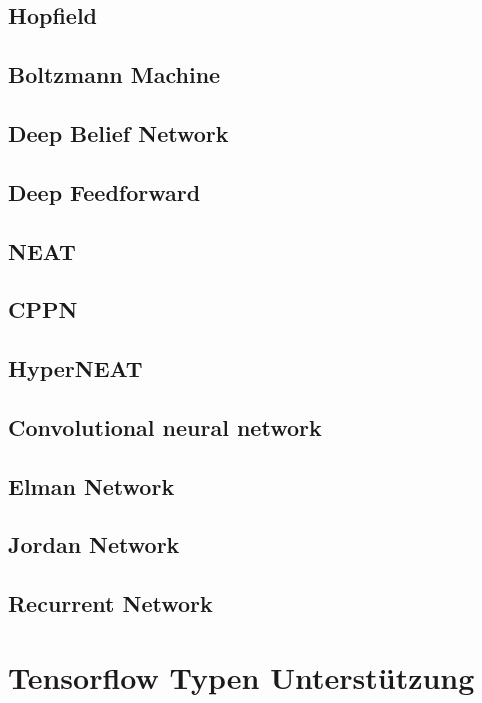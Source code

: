 \subsection{Hopfield}

\subsection{Boltzmann Machine}

\subsection{Deep Belief Network}

\subsection{Deep Feedforward}

\subsection{NEAT}

\subsection{CPPN}

\subsection{HyperNEAT}

\subsection{Convolutional neural network}

\subsection{Elman Network}

\subsection{Jordan Network}

\subsection{Recurrent Network}

\section{Tensorflow Typen Unterstützung}
